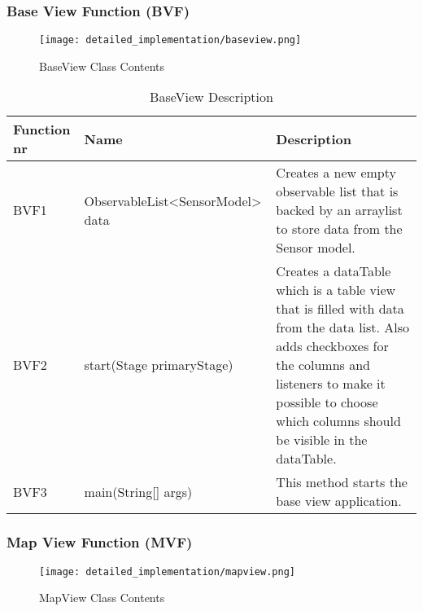 \documentclass[../document]{subfiles}
\begin{document}
\subsubsection{Base View Function (BVF)}

\begin{figure}[H]
\centering
\texttt{[image: detailed\_implementation/baseview.png]}
\caption{BaseView Class Contents}
\end{figure}

\begin{table}[H]
\caption{BaseView Description}
\centering
\begin{tabularx}{\textwidth}{|l|l|X|}
	\hline
	Function nr
	&Name
	&Description
	\\ \hline BVF1
	&ObservableList<SensorModel> data
	&Creates a new empty observable list that is backed by an arraylist to store data from the Sensor model.
	\\ \hline BVF2
	&start(Stage primaryStage)
	&Creates a dataTable which is a table view that is filled with data from the data list. Also adds checkboxes for the columns and listeners to make it possible to choose which columns should be visible in the dataTable.
	\\ \hline BVF3
	&main(String[] args)
	&This method starts the base view application.
	\\ \hline 
\end{tabularx}
\end{table}

\subsubsection{Map View Function (MVF)}

\begin{figure}[H]
\centering
\texttt{[image: detailed\_implementation/mapview.png]}
\caption{MapView Class Contents}
\end{figure}
\end{document}
